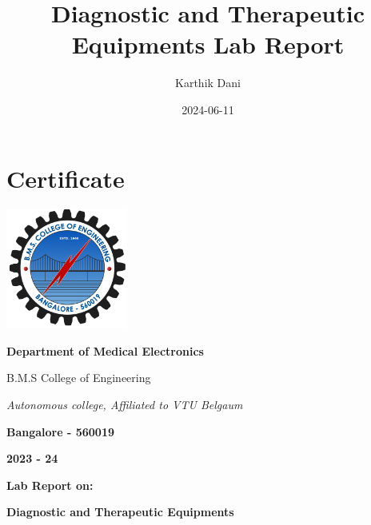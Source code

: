 \documentclass[
  11pt,
  letterpaper,
  DIV=11,
  numbers=noendperiod]{scrreprt}
\title{Diagnostic and Therapeutic Equipments Lab Report}
\author{Karthik Dani}
\date{2024-06-11}
\renewcommand*\contentsname{Table of contents}
\newcommand\contentsname{Table of contents}
\begin{document}
\maketitle

\renewcommand*\contentsname{Table of Contents}
{
\hypersetup{linkcolor=}
\setcounter{tocdepth}{1}
\tableofcontents
}

\chapter*{Certificate}\label{certificate}


\begin{center}
    \includegraphics[width=0.3\textwidth]{bmsce_logo.svg.png} %
\end{center}

\begin{center}
    \LARGE \textbf{Department of Medical Electronics}
\end{center}

\begin{center}
    \large B.M.S College of Engineering
\end{center}

\begin{center}
    \textit{Autonomous college, Affiliated to VTU Belgaum}
\end{center}

\begin{center}
    \textbf{Bangalore - 560019}
\end{center}

\begin{center}
    \textbf{2023 - 24}
\end{center}


\begin{center}
    \textbf{Lab Report on:}
\end{center}

\begin{center}
    \large \textbf{Diagnostic and Therapeutic Equipments}
\end{center}
\end{document}
